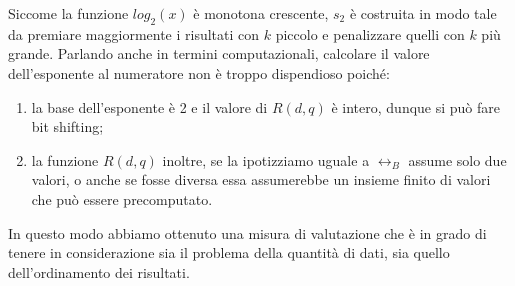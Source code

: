 Siccome la funzione $log_2(x)$ è monotona crescente, $s_2$ è costruita in modo tale da
premiare maggiormente i risultati con $k$ piccolo e penalizzare quelli con $k$ più grande.
Parlando anche in termini computazionali, calcolare il valore dell'esponente al numeratore
non è troppo dispendioso poiché:
\begin{enumerate}
	\item la base dell'esponente è 2 e il valore di $R(d,q)$ è intero, dunque si può fare bit shifting;
	\item la funzione $R(d,q)$ inoltre, se la ipotizziamo uguale a $\rel_B$ assume solo due valori,
	o anche se fosse diversa essa assumerebbe un insieme finito di valori che può essere precomputato.
\end{enumerate}

In questo modo abbiamo ottenuto una misura di valutazione che è in grado di tenere in considerazione
sia il problema della quantità di dati, sia quello dell'ordinamento dei risultati.